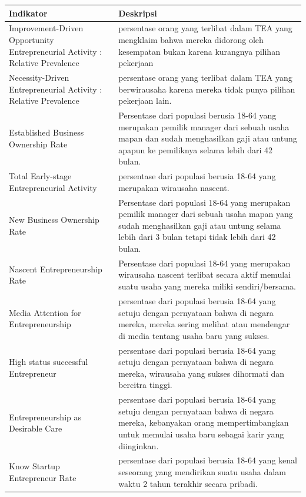 \begin{table}[H]
\centering
\begin{tabular}{|p{3cm}|p{10cm}|}
\hline
Indikator & Deskripsi\\
\hline
Improvement-Driven Opportunity Entrepreneurial Activity : Relative Prevalence & persentase orang yang terlibat dalam TEA yang mengklaim bahwa mereka didorong oleh kesempatan bukan karena kurangnya pilihan pekerjaan\\
\hline
Necessity-Driven Entrepreneurial Activity : Relative Prevalence & persentase orang yang terlibat dalam TEA yang berwirausaha karena mereka tidak punya pilihan pekerjaan lain.\\
\hline
Established Business Ownership Rate & Persentase dari populasi berusia 18-64 yang merupakan pemilik manager dari sebuah usaha mapan dan sudah menghasilkan gaji atau untung apapun ke pemiliknya selama lebih dari 42 bulan.\\
\hline
Total Early-stage Entrepreneurial Activity & persentase dari populasi berusia 18-64 yang merupakan wirausaha nascent.\\
\hline
New Business Ownership Rate & Persentase dari populasi 18-64 yang merupakan pemilik manager dari sebuah usaha mapan yang sudah menghasilkan gaji atau untung selama lebih dari 3 bulan tetapi tidak lebih dari 42 bulan.\\
\hline
Nascent Entrepreneurship Rate & Persentase dari populasi 18-64 yang merupakan wirausaha nascent terlibat secara aktif memulai suatu usaha yang mereka miliki sendiri/bersama.\\
\hline
Media Attention for Entrepreneurship & persentase dari populasi berusia 18-64 yang setuju dengan pernyataan bahwa di negara mereka, mereka sering melihat atau mendengar di media tentang usaha baru yang sukses.\\
\hline
High status successful Entrepreneur & persentase dari populasi berusia 18-64 yang setuju dengan pernyataan bahwa di negara mereka, wirausaha yang sukses dihormati dan bercitra tinggi.\\
\hline
Entrepreneurship as Desirable Care & persentase dari populasi berusia 18-64 yang setuju dengan pernyataan bahwa di negara mereka, kebanyakan orang mempertimbangkan untuk memulai usaha baru sebagai karir yang diinginkan.\\
\hline
Know Startup Entrepreneur Rate & persentase dari populasi berusia 18-64 yang kenal seseorang yang mendirikan suatu usaha dalam waktu 2 tahun terakhir secara pribadi.\\
\hline
\end{tabular}
\end{table}



